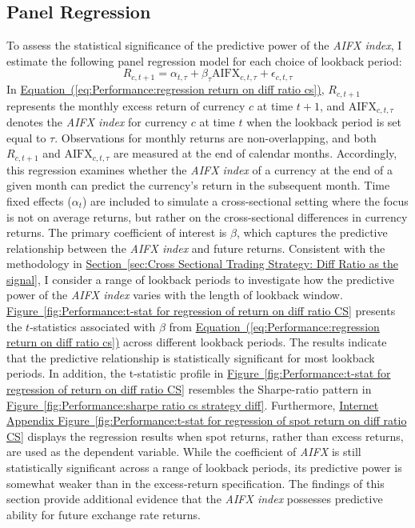 \documentclass[12pt,oneside,letter]{article}
\newcommand*{\myfig}[1]{\hyperref[{#1}]{Figure~\ref*{#1}}}
\newcommand*{\mysec}[1]{\hyperref[{#1}]{Section~\ref*{#1}}}
\newcommand*{\myeq}[1]{\hyperref[{#1}]{Equation~(\ref*{#1})}}
\newcommand*{\myfigIA}[1]{\hyperref[{#1}]{Internet Appendix Figure~\ref*{#1}}}
\begin{document}
		
		\subsection{Panel Regression}	\label{sec:Panel Regression}
		To assess the statistical significance of the predictive power of the \textit{AIFX index}, I estimate the following panel regression model for each choice of lookback period:
		\begin{equation}
			R_{c,t+1} = \alpha_{t,\tau} + \beta_{\tau} \text{AIFX}_{c,t,\tau} + \epsilon_{c,t,\tau}
			\label{eq:Performance:regression return on diff ratio cs}
		\end{equation}
		In \myeq{eq:Performance:regression return on diff ratio cs}, \(R_{c,t+1}\) represents the monthly excess return of currency \(c\) at time \(t+1\), and \(\text{AIFX}_{c,t,\tau}\) denotes the \textit{AIFX index} for currency \(c\) at time \(t\) when the lookback period is set equal to \(\tau\). Observations for monthly returns are non-overlapping, and both \(R_{c,t+1}\) and \(\text{AIFX}_{c,t,\tau}\) are measured at the end of calendar months. Accordingly, this regression examines whether the \textit{AIFX index} of a currency at the end of a given month can predict the currency's return in the subsequent month. Time fixed effects (\(\alpha_t\)) are included to simulate a cross-sectional setting where the focus is not on average returns, but rather on the cross-sectional differences in currency returns. The primary coefficient of interest is \(\beta\), which captures the predictive relationship between the \textit{AIFX index} and future returns. Consistent with the methodology in \mysec{sec:Cross Sectional Trading Strategy: Diff Ratio as the signal}, I consider a range of lookback periods to investigate how the predictive power of the \textit{AIFX index} varies with the length of lookback window. \myfig{fig:Performance:t-stat for regression of return on diff ratio CS} presents the \(t\)-statistics associated with \(\beta\) from \myeq{eq:Performance:regression return on diff ratio cs} across different lookback periods. The results indicate that the predictive relationship is statistically significant for most lookback periods. In addition, the t-statistic profile in \myfig{fig:Performance:t-stat for regression of return on diff ratio CS} resembles the Sharpe-ratio pattern in \myfig{fig:Performance:sharpe ratio cs strategy diff}. Furthermore, \myfigIA{fig:Performance:t-stat for regression of spot return on diff ratio CS} displays the regression results when spot returns, rather than excess returns, are used as the dependent variable. While the coefficient of \textit{AIFX} is still statistically significant across a range of lookback periods, its predictive power is somewhat weaker than in the excess-return specification. The findings of this section provide additional evidence that the \textit{AIFX index} possesses predictive ability for future exchange rate returns.
		
\end{document}
